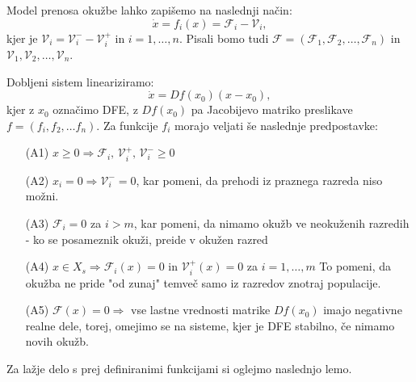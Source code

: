 \documentclass[a4paper,12pt]{article}
\newcommand{\F}{\mathcal F}
\newcommand{\V}{\mathcal V}
\begin{document}
Model prenosa okužbe lahko zapišemo na naslednji način:
\begin{equation} \label{eq1}
\dot{x}=f_i(x)=\F_i - \V_i,
\end{equation}
kjer je \(\V_i=\V_i^- - \V_i^+\) in \(i=1,\ldots,n\). 
Pisali bomo tudi \(\F=(\F_1,\F_2,\ldots,\F_n)\) in \(\V_1,\V_2,\ldots,\V_n\).

Dobljeni sistem lineariziramo:
\begin{equation} \label{eq2}
\dot{x}=Df(x_0)(x-x_0),
\end{equation}
kjer z \(x_0\) označimo DFE, z \(Df(x_0)\) pa Jacobijevo matriko preslikave 
\(f=(f_i, f_2, \ldots f_n)\).
Za funkcije \(f_i\)
morajo veljati še naslednje predpostavke:

\begin{itemize}
    \item[(A1)] \(x\geq 0 \Rightarrow \F_i\textrm{, }\V_i^+\textrm{, }\V_i^- \geq 0\)
    \item[(A2)] \(x_i=0 \Rightarrow \V_i^- =0\), kar pomeni, da prehodi iz praznega 
    razreda niso možni. 
    \item[(A3)] \(\F_i=0\) za \(i>m\), kar pomeni, da nimamo okužb ve neokuženih razredih - 
    ko se posameznik okuži, preide v okužen razred 
    \item[(A4)] \(x\in X_s \Rightarrow \F_i(x)=0\) in \(\V_i^+(x)=0\) za \(i=1,\ldots,m\)
    To pomeni, da okužba ne pride "od zunaj" temveč samo iz razredov znotraj populacije. 
    \item[(A5)] \(\F(x)=0 \Rightarrow\) vse lastne vrednosti matrike \(Df(x_0)\) imajo 
    negativne realne dele, torej, omejimo se na sisteme, kjer je DFE stabilno, če nimamo novih okužb.    
\end{itemize}

Za lažje delo s prej definiranimi funkcijami si oglejmo naslednjo lemo.
\end{document}

